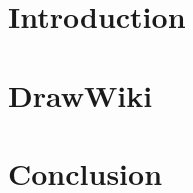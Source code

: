 \documentclass[sigconf]{acmart}
\begin{document}
\maketitle

\section{Introduction}

\section{DrawWiki}

\section{Conclusion}

\large


\end{document}
